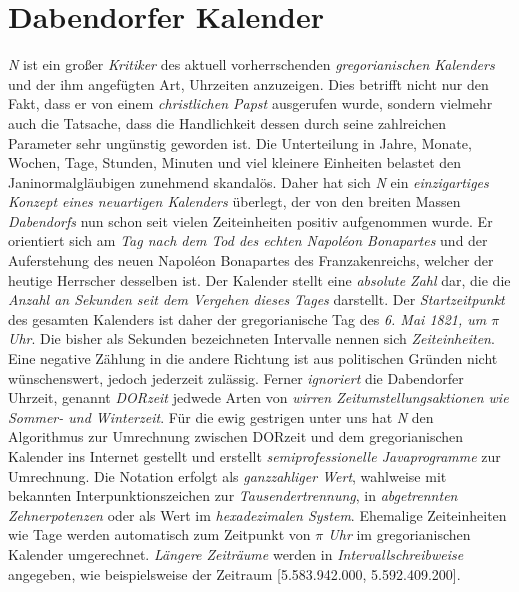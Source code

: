 \section{{Dabendorfer Kalender}}\label{DabendorferKalender}
\textit{N} ist ein großer \textit{Kritiker} des aktuell vorherrschenden \textit{gregorianischen Kalenders} und der ihm angefügten Art, Uhrzeiten anzuzeigen. Dies betrifft nicht nur den Fakt, dass er von einem \textit{christlichen Papst} ausgerufen wurde, sondern vielmehr auch die Tatsache, dass die Handlichkeit dessen durch seine zahlreichen Parameter sehr ungünstig geworden ist. Die Unterteilung in Jahre, Monate, Wochen, Tage, Stunden, Minuten und viel kleinere Einheiten belastet den Janinormalgläubigen zunehmend skandalös. Daher hat sich \textit{N} ein \textit{einzigartiges Konzept eines neuartigen Kalenders} überlegt, der von den breiten Massen \textit{Dabendorfs} nun schon seit vielen Zeiteinheiten positiv aufgenommen wurde. Er orientiert sich am \textit{Tag nach dem Tod des echten Napoléon Bonapartes} und der Auferstehung des neuen Napoléon Bonapartes des Franzakenreichs, welcher der heutige Herrscher desselben ist. Der Kalender stellt eine \textit{absolute Zahl} dar, die die \textit{Anzahl an Sekunden seit dem Vergehen dieses Tages} darstellt. Der \textit{Startzeitpunkt} des gesamten Kalenders ist daher der gregorianische Tag des \textit{6. Mai 1821, um $\pi$ Uhr}. Die bisher als Sekunden bezeichneten Intervalle nennen sich \textit{Zeiteinheiten}. Eine negative Zählung in die andere Richtung ist aus politischen Gründen nicht wünschenswert, jedoch jederzeit zulässig. Ferner \textit{ignoriert} die Dabendorfer Uhrzeit, genannt \textit{DORzeit} jedwede Arten von \textit{wirren Zeitumstellungsaktionen wie Sommer- und Winterzeit}. Für die ewig gestrigen unter uns hat \textit{N} den Algorithmus zur Umrechnung zwischen DORzeit und dem gregorianischen Kalender ins Internet gestellt und erstellt \textit{semiprofessionelle Javaprogramme} zur Umrechnung. Die Notation erfolgt als \textit{ganzzahliger Wert}, wahlweise mit bekannten Interpunktionszeichen zur \textit{Tausendertrennung}, in \textit{abgetrennten Zehnerpotenzen} oder als Wert im \textit{hexadezimalen System}. Ehemalige Zeiteinheiten wie Tage werden automatisch zum Zeitpunkt von \textit{$\pi$ Uhr} im gregorianischen Kalender umgerechnet. \textit{Längere Zeiträume} werden in \textit{Intervallschreibweise} angegeben, wie beispielsweise der Zeitraum [5.583.942.000, 5.592.409.200]. 

